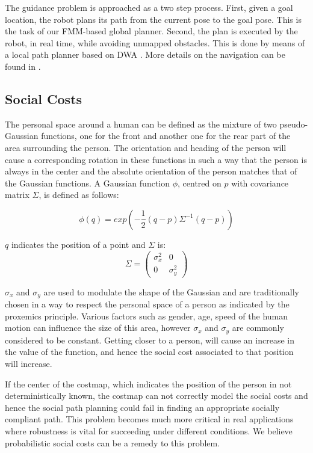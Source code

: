 The guidance problem is approached as a two step process. First, given a goal location, the robot plans its path from the current pose to the goal pose. This is the task of our FMM-based global planner. Second, the plan is executed by the robot, in real time, while avoiding unmapped obstacles. This is done by means of a local path planner based on DWA \cite{fox1997dynamic}. More details on the navigation can be found in \cite{ventura2015}.

\subsection{Social Costs}


The personal space around a human can be defined as the mixture of two pseudo-Gaussian functions, one for the front and another one for the rear part of the area surrounding the person. The orientation and heading of the person will cause a corresponding rotation in these functions in such a way that the person is always in the center and the absolute orientation of the person matches that of the Gaussian functions. 
A Gaussian function $\phi$, centred on $p$ with covariance matrix $\Sigma$, is defined as follows:

\begin{equation}
\phi(q) = exp(-\frac{1}{2}(q-p)\Sigma^{-1}(q-p))
\end{equation}

$q$ indicates the position of a point and $\Sigma$ is:
\begin{equation}
\Sigma = \begin{pmatrix}
{\sigma}_{x}^2  & 0\\ 
 0& {\sigma}_{y}^2 
\end{pmatrix}
\end{equation}

${\sigma}_{x}$ and ${\sigma}_{y}$ are used to modulate the shape of the Gaussian and are traditionally chosen in a way to respect the personal space of a person as indicated by the proxemics principle. Various factors such as gender, age, speed of the human motion \cite{kirby2009companion} can influence the size of this area, however ${\sigma}_{x}$ and ${\sigma}_{y}$ are commonly considered to be constant. Getting closer to a person, will cause an increase in the value of the function, and hence the social cost associated to that position will increase.

If the center of the costmap, which indicates the position of the person in not deterministically known, the costmap can not correctly model the social costs and hence the social path planning could fail in finding an appropriate socially compliant path. This problem becomes much more critical in real applications where robustness is vital for succeeding under different conditions. We believe probabilistic social costs can be a remedy to this problem. 


